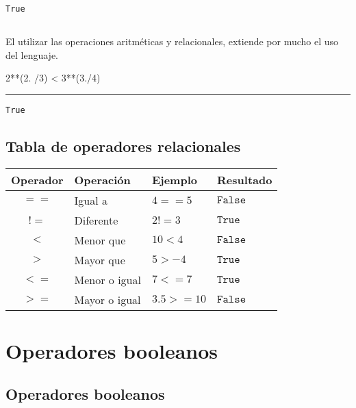 \documentclass[]{article}
\newenvironment{Shaded}{}{}
\newcommand{\DecValTok}[1]{\textcolor[rgb]{0.25,0.63,0.44}{#1}}
\newcommand{\OperatorTok}[1]{\textcolor[rgb]{0.40,0.40,0.40}{#1}}
\newcommand{\NormalTok}[1]{#1}
\begin{document}
\begin{verbatim}
True
\end{verbatim}

\subsection{}\label{section-4}

El utilizar las operaciones aritméticas y relacionales, extiende por
mucho el uso del lenguaje.

\begin{Shaded}
\begin{Highlighting}[]
\DecValTok{2}\OperatorTok{**}\NormalTok{(}\DecValTok{2}\NormalTok{. }\OperatorTok{/}\DecValTok{3}\NormalTok{) }\OperatorTok{<} \DecValTok{3}\OperatorTok{**}\NormalTok{(}\DecValTok{3}\NormalTok{.}\OperatorTok{/}\DecValTok{4}\NormalTok{)}
\end{Highlighting}
\end{Shaded}

\begin{center}\rule{0.5\linewidth}{\linethickness}\end{center}

\begin{verbatim}
True
\end{verbatim}

\subsection{Tabla de operadores
relacionales}\label{tabla-de-operadores-relacionales}

\begin{longtable}[]{@{}clll@{}}
\toprule
Operador & Operación & Ejemplo & Resultado\tabularnewline
\midrule
\endhead
\(==\) & Igual a & \(4==5\) & \(\texttt{False}\)\tabularnewline
\(!=\) & Diferente & \(2!=3\) & \(\texttt{True}\)\tabularnewline
\(<\) & Menor que & \(10<4\) & \(\texttt{False}\)\tabularnewline
\(>\) & Mayor que & \(5>-4\) & \(\texttt{True}\)\tabularnewline
\(<=\) & Menor o igual & \(7<=7\) & \(\texttt{True}\)\tabularnewline
\(>=\) & Mayor o igual & \(3.5 >= 10\) &
\(\texttt{False}\)\tabularnewline
\bottomrule
\end{longtable}

\section{Operadores booleanos}\label{operadores-booleanos}

\subsection{Operadores booleanos}\label{operadores-booleanos-1}
\end{document}
